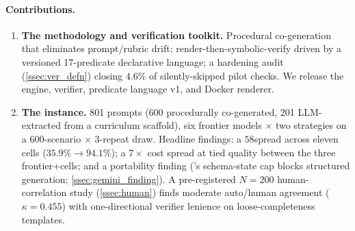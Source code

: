 \paragraph{Contributions.}
\begin{enumerate}
\item \textbf{The \GeoGen methodology and verification toolkit.} Procedural co-generation that eliminates prompt/rubric drift; render-then-symbolic-verify driven by a versioned 17-predicate declarative language; a hardening audit (\cref{ssec:ver_defn}) closing $4.6\%$ of silently-skipped pilot checks. We release the engine, verifier, predicate language v1, and Docker renderer.
\item \textbf{The \GeoGenBench instance.} 801 prompts (600 procedurally co-generated, 201 LLM-extracted from a curriculum scaffold), six frontier models $\times$ two strategies on a $600$-scenario $\times$ $3$-repeat draw. Headline findings: a $58$\pp spread across eleven cells ($35.9\% \to 94.1\%$); a $7\times$ cost spread at tied quality between the three frontier+\structured cells; and a portability finding (\geminiflash's schema-state cap blocks structured generation; \cref{ssec:gemini_finding}). A pre-registered $N{=}200$ human-correlation study (\cref{ssec:human}) finds moderate auto/human agreement ($\kappa{=}0.455$) with one-directional verifier lenience on loose-completeness templates.
\end{enumerate}

